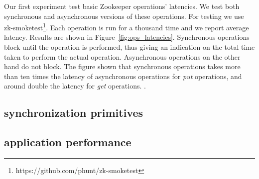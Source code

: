 Our first experiment test basic Zookeeper operations' latencies. We test both synchronous and asynchronous versions of these operations. For testing we use zk-smoketest\footnote{https://github.com/phunt/zk-smoketest}. Each operation is run for a thousand time and we report average latency. Results are shown in Figure~\ref{fig:ops_latencies}. Synchronous operations block until the operation is performed, thus giving an indication on the total time taken to perform the actual operation. Asynchronous operations on the other hand do not block. The figure shown that synchronous operations takes more than ten times the latency of asynchronous operations for \emph{put} operations, and around double the latency for \emph{get} operations. . 

\subsection{synchronization primitives}

\subsection{application performance}

